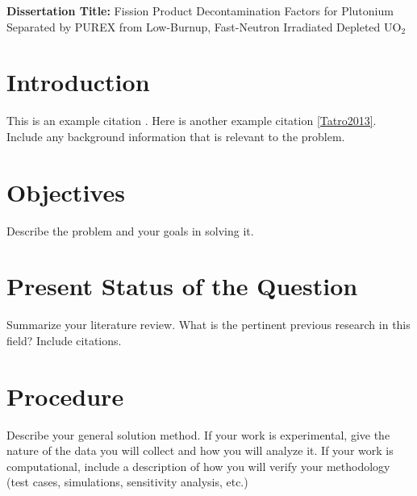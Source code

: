 \documentclass[11pt,notitlepage]{article}
\begin{document}
\vspace*{0.5cm}


\vspace{1cm}
\textbf{Dissertation Title:} Fission Product Decontamination Factors
for Plutonium Separated by PUREX from Low-Burnup, Fast-Neutron
 Irradiated Depleted UO$_2$

 
\section{Introduction}

This is an example citation \cite{Tatro2013}.
Here is another example citation \ref{Tatro2013}. Include any
background information that is relevant to the problem.


\section{Objectives}

Describe the problem and your goals in solving it.



\section{Present Status of the Question}

Summarize your literature review. What is the pertinent
previous research in this field? Include citations.


\section{Procedure}

Describe your general solution method. If your work is
experimental, give the nature of the data you will collect
and how you will analyze it. If your work is computational,
include a description of how you will verify your methodology
(test cases, simulations, sensitivity analysis, etc.)
\end{document}
